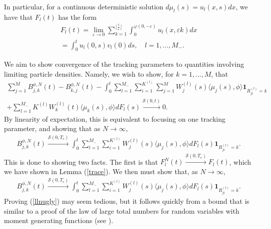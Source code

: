 In particular, for a continuous deterministic solution $d\mu_l(s) = u_l(x,s)dx$, we have that $F_l(t)$ has the form 
\begin{eqnarray}
F_l(t) = \lim_{\varepsilon \rightarrow 0}\sum_{k = 1}^{\lfloor \frac t\varepsilon \rfloor}\int_0^{\varphi(0,-\varepsilon)}u_l(x,\varepsilon k)dx\\
 =  \int_0^tu_l(0,s)v_l(0)ds,\quad l = 1, \dots, M_-.\nonumber 
\end{eqnarray}

We aim to show convergence of the tracking parameters to quantities involving limiting particle densities.  Namely, we wish to show, for $k = 1, \dots, M$, that
\begin{eqnarray}\sum_{j= 1}^M B_{j,k}^{\phi,N}(t)-B_{k,j}^{\phi,N}(t)-\int_0^t\sum_{l = 1}^{M_-}\sum_{i = 1}^{K^{(l)}}\sum_{j = 1}^MW_j^{(l)}(s)\langle \mu_j(s), \phi\rangle\mathbf 1_{R^{(l)}_{ji} = k} 
\\+\sum_{l = 1}^{M_-}K^{(l)}W_k^{(l)}(t)\langle \mu_k(s), \phi\rangle dF_{l}(s)\xrightarrow{\mathcal S(0,t)} 0. \quad \nonumber 
\end{eqnarray}
By linearity of expectation, this is equivalent to focusing on one tracking parameter, and showing that as $N\rightarrow \infty$,
\begin{eqnarray} B_{j,k}^{\phi,N}(t)
\xrightarrow{\mathcal S(0,T_{e})} \int_0^t\sum_{l = 1}^{M_-}\sum_{i= 1}^{K^{(l)}}W_j^{(l)}(s)\langle \mu_j(s), \phi\rangle dF_{l}(s)\mathbf 1_{R^{(l)}_{ji} = k}. 
\end{eqnarray}
This is done to showing two facts.  The first is that $F^N_l(t) \xrightarrow{\mathcal S(0,T_{e})} F_{l}(t)$, which we have shown in Lemma (\ref{trace}).  We then must show that, as $N\rightarrow \infty$,
\begin{eqnarray}\label{llnugly}
 B_{j,k}^{\phi,N}(t)
\xrightarrow{\mathcal S(0,T_{e})} \int_0^t\sum_{l = 1}^{M_-}\sum_{i= 1}^{K^{(l)}}W_j^{(l)}(s)\langle \mu_j(s), \phi\rangle dF_{l}(s)\mathbf 1_{R^{(l)}_{ji} = k}. 
\end{eqnarray}
Proving (\ref{llnugly}) may seem tedious, but it follows quickly from a bound that is similar to a proof of the law of large total numbers for random variables with moment generating functions (see \cite{tijms2012understanding}).  

